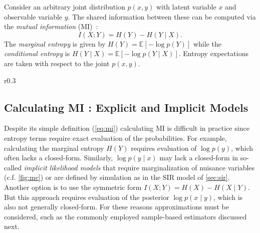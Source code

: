 Consider an arbitrary joint distribution $p(x,y)$ with latent variable $x$ and
observable variable $y$.  The shared information between these can be
computed via the \emph{mutual information} (MI)~\cite{Cover2006,
mackay2003information}:
\begin{equation}\label{eq:mi}
  I(X;Y) = H(Y) - H(Y \mid X).
\end{equation}
The \emph{marginal entropy} is given by \mbox{$H(Y) = \mathbb{E}[
- \log p(Y) ]$} while the \emph{conditional entropy}
is \mbox{$H(Y \mid X) = \mathbb{E}[ - \log p(Y \mid X) ]$}.  Entropy
expectations are taken with respect to the joint $p(x,y)$.  

\begin{wrapfigure}{r}{0.3\textwidth}
 \vspace*{-10mm}
 \centering
 \caption{\small \textbf{Implicit Likelihood via Nuisance Variables} Likelihood $p(y \mid x)$
 marginalizes  $z$.}
 \label{fig:mc}
\end{wrapfigure}

\subsection{Calculating MI : Explicit and Implicit Models}
Despite its simple definition (\EQN\eqref{eq:mi}) calculating MI is
difficult in practice since entropy terms require exact evaluation of
the probabilities.  For example, calculating the marginal entropy
$H(Y)$ requires evaluation of $\log p(y)$, which often lacks a
closed-form.  Similarly, $\log p(y \mid x)$ may lack a closed-form in
so-called \emph{implicit likelihood models} that require
marginalization of nuisance variables (c.f. \FIG\ref{fig:mc}) or are
defined by simulation as in the SIR model
of \SEC\ref{sec:sir}. Another option is to use the symmetric form
$I(X;Y) = H(X) - H(X\mid Y)$. But this approach requires evaluation of
the posterior $\log p(x \mid y)$, which is also not generally
closed-form.  For these reasons approximations must be considered,
such as the commonly employed sample-based estimators discussed next.

